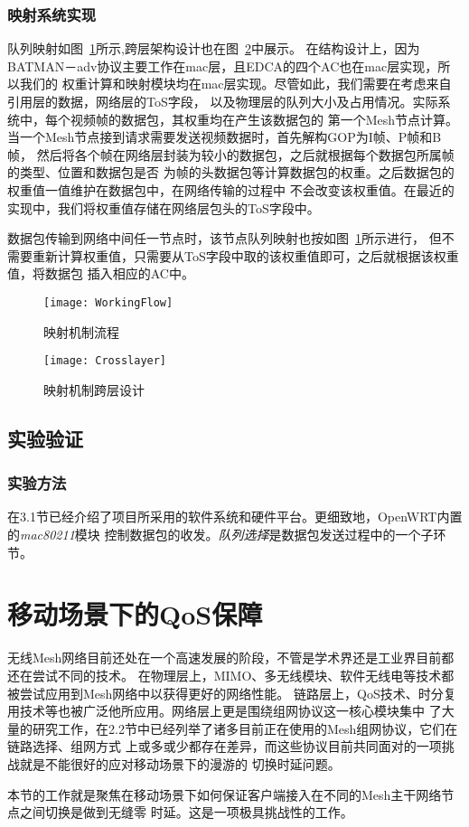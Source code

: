 \subsubsection{映射系统实现}
队列映射如图~\ref{fig:workingflow}所示,跨层架构设计也在图~\ref{fig:crosslayer}中展示。
在结构设计上，因为BATMAN－adv协议主要工作在mac层，且EDCA的四个AC也在mac层实现，所以我们的
权重计算和映射模块均在mac层实现。尽管如此，我们需要在考虑来自引用层的数据，网络层的ToS字段，
以及物理层的队列大小及占用情况。实际系统中，每个视频帧的数据包，其权重均在产生该数据包的
第一个Mesh节点计算。当一个Mesh节点接到请求需要发送视频数据时，首先解构GOP为I帧、P帧和B帧，
然后将各个帧在网络层封装为较小的数据包，之后就根据每个数据包所属帧的类型、位置和数据包是否
为帧的头数据包等计算数据包的权重。之后数据包的权重值一值维护在数据包中，在网络传输的过程中
不会改变该权重值。在最近的实现中，我们将权重值存储在网络层包头的ToS字段中。

数据包传输到网络中间任一节点时，该节点队列映射也按如图~\ref{fig:workingflow}所示进行，
但不需要重新计算权重值，只需要从ToS字段中取的该权重值即可，之后就根据该权重值，将数据包
插入相应的AC中。

\begin{figure}[H] %
  \centering
  \texttt{[image: WorkingFlow]}
  \caption{映射机制流程}
  \label{fig:workingflow}
\end{figure}
\begin{figure}[H] %
  \centering
  \texttt{[image: Crosslayer]}
  \caption{映射机制跨层设计}
  \label{fig:crosslayer}
\end{figure}

\subsection{实验验证}
\renewcommand{\thesubsubsection}{\Alph{subsubsection}.}
\subsubsection{实验方法}
在3.1节已经介绍了项目所采用的软件系统和硬件平台。更细致地，OpenWRT内置的\emph{mac80211}模块
控制数据包的收发。\emph{队列选择}是数据包发送过程中的一个子环节。





\section{移动场景下的QoS保障}
无线Mesh网络目前还处在一个高速发展的阶段，不管是学术界还是工业界目前都还在尝试不同的技术。
在物理层上，MIMO、多无线模块、软件无线电等技术都被尝试应用到Mesh网络中以获得更好的网络性能。
链路层上，QoS技术、时分复用技术等也被广泛他所应用。网络层上更是围绕组网协议这一核心模块集中
了大量的研究工作，在2.2节中已经列举了诸多目前正在使用的Mesh组网协议，它们在链路选择、组网方式
上或多或少都存在差异，而这些协议目前共同面对的一项挑战就是不能很好的应对移动场景下的漫游的
切换时延问题。

本节的工作就是聚焦在移动场景下如何保证客户端接入在不同的Mesh主干网络节点之间切换是做到无缝零
时延。这是一项极具挑战性的工作。












